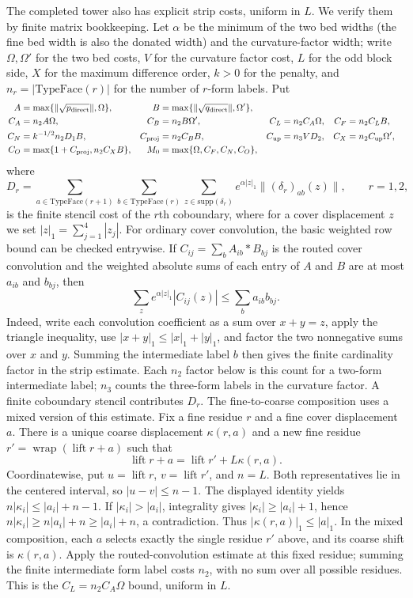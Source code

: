 The completed tower also has explicit strip costs, uniform in $L$.
We verify them by finite matrix bookkeeping. Let $\alpha$
be the minimum of the two bed widths (the fine bed width is also
the donated width) and the curvature-factor width; write $\Omega,\Omega'$ for the two bed costs, $V$ for the curvature
factor cost, $L$ for the odd block side, $X$ for the maximum difference
order, $k>0$ for the penalty, and $n_r=|\mathrm{TypeFace}(r)|$ for the
number of $r$-form labels. Put
\begin{align*}
 A&=\max\{\|\sqrt{p_{\rm direct}}\|,\Omega\},
 &B&=\max\{\|\sqrt{q_{\rm direct}}\|,\Omega'\},\\
 C_A&=n_2 A\Omega,& C_B&=n_2B\Omega',&
 C_L&=n_2 C_A\Omega,& C_F&=n_2C_LB,\\
 C_{N}&=k^{-1/2}n_2D_1B,&
 C_{\rm proj}&=n_2C_BB,&
 C_{\rm up}&=n_3VD_2,& C_X&=n_2C_{\rm up}\Omega',\\
 C_O&=\max\{1+C_{\rm proj},n_2C_XB\},&
 M_0&=\max\{\Omega,C_F,C_N,C_O\},
\end{align*}
where
\[
 D_r=\sum_{a\in\mathrm{TypeFace}(r+1)}
       \sum_{b\in\mathrm{TypeFace}(r)}
       \sum_{z\in\mathrm{supp}(\delta_r)}
       e^{\alpha|z|_1}\| (\delta_r)_{ab}(z)\|,
 \qquad r=1,2,
\]
is the finite stencil cost of the $r$th coboundary, where for a cover
displacement $z$ we set $|z|_1=\sum_{j=1}^4|z_j|$. For ordinary cover convolution, the basic weighted row bound can be
checked entrywise. If $C_{ij}=\sum_b A_{ib}*B_{bj}$
is the routed cover convolution and the weighted absolute sums of each
entry of $A$ and $B$ are at most $a_{ib}$ and $b_{bj}$, then
\[
 \sum_z e^{\alpha|z|_1}|C_{ij}(z)|
 \leq \sum_b a_{ib}b_{bj}.
\]
Indeed, write each convolution coefficient as a sum over $x+y=z$, apply
the triangle inequality, use $|x+y|_1\leq|x|_1+|y|_1$, and factor the two
nonnegative sums over $x$ and $y$. Summing the intermediate label $b$
then gives the finite cardinality factor in the strip estimate. Each $n_2$
factor below is this count for a two-form intermediate label; $n_3$ counts
the three-form labels in the curvature factor. A finite coboundary stencil
contributes $D_r$.
The fine-to-coarse composition uses a mixed version of this estimate.
Fix a fine residue $r$ and a fine cover displacement $a$. There is a unique
coarse displacement $\kappa(r,a)$ and a new fine residue
$r'=\operatorname{wrap}(\operatorname{lift}r+a)$ such that
\[
 \operatorname{lift}r+a=\operatorname{lift}r'+L\kappa(r,a).
\]
Coordinatewise, put $u=\operatorname{lift}r$, $v=\operatorname{lift}r'$, and
$n=L$. Both representatives lie in the centered interval, so
$|u-v|\leq n-1$. The displayed identity yields
$n|\kappa_i|\leq |a_i|+n-1$. If $|\kappa_i|>|a_i|$, integrality gives
$|\kappa_i|\geq|a_i|+1$, hence
$n|\kappa_i|\geq n|a_i|+n\geq |a_i|+n$, a contradiction. Thus
$|\kappa(r,a)|_1\leq|a|_1$. In the mixed composition, each $a$ selects
exactly the single residue $r'$ above, and its coarse shift is
$\kappa(r,a)$. Apply the routed-convolution estimate at this fixed residue;
summing the finite intermediate form label costs $n_2$, with no sum over
all possible residues. This is the $C_L=n_2C_A\Omega$ bound, uniform in
$L$.

